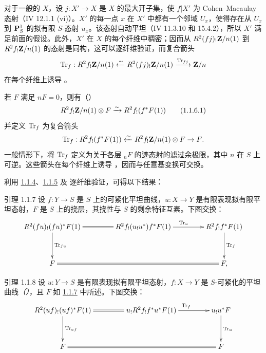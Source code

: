 对于一般的 $X$，设 $j:X'\rightarrow X$ 是 $X$ 的最大开子集，使 $f|X'$ 为 Cohen--Macaulay 态射（\cf \EGA IV 12.1.1 (vi)）。$X'$ 的每一点 $x$ 在 $X'$ 中都有一个邻域 $U_{x}$，使得存在从 $U_{x}$ 到 $\mathbf{P}^{1}_{S}$ 的拟有限 $S$-态射 $u_{x}$。该态射自动平坦（\EGA IV 11.3.10 和 15.4.2），所以 $X'$ 满足前面的假设。此外，$X'$ 在 $X$ 的每个纤维中稠密；因而从 $R^{2}(fj)_{!}\mathbf{Z}/n(1)$ 到 $R^{2}f_{!}\mathbf{Z}/n(1)$ 的态射是同构，这可以逐纤维验证，而复合箭头
$$
\operatorname{Tr}_{f}:R^{2}f_{!}\mathbf{Z}/n(1)\xleftarrow{\sim}
R^{2}(fj)_{!}\mathbf{Z}/n(1)\xrightarrow{\operatorname{Tr}_{fj}}\mathbf{Z}/n
$$
在每个纤维上诱导 。

若 $F$ 满足 $nF=0$，则有（）
\begin{equation*}
R^{2}f_{!}\mathbf{Z}/n(1)\otimes F\xrightarrow{\sim}
R^{2}f_{!}(f^{\ast}F(1))\tag{1.1.6.1}
\end{equation*}%
并定义 $\operatorname{Tr}_{f}$ 为复合箭头
$$
\operatorname{Tr}_{f}:R^{2}f_{!}(f^{\ast}F(1))\xleftarrow{\sim}
R^{2}f_{!}\mathbf{Z}/n(1) \otimes F\rightarrow F{}.
$$
一般情形下，将 $\operatorname{Tr}_{f}$ 定义为关于各层 ${}_nF$ 的迹态射的滤过余极限，其中 $n$ 在 $S$ 上可逆。这些箭头在每个纤维上诱导 ，因而与任意基变换可交换。\cqfd

利用 \hyperref[XVIII.lem1.1.4]{1.1.4}、\hyperref[XVIII.lem1.1.5]{1.1.5} 及  逐纤维\pageoriginale{}验证，可得以下结果：

\begin{enonce*}{引理 1.1.7}
设 $f:Y\rightarrow S$ 是 $S$ 上的可紧化平坦曲线，$u:X\rightarrow Y$ 是有限表现拟有限平坦态射，$F$ 是 $S$ 上的挠层，其挠性与 $S$ 的剩余特征互素。下图交换：
$$
\xymatrix@C=1.5cm@R=1.25cm{
R^2(fu)_! (fu)^{\ast}F(1) \ar[d]^{\Tr_{fu}}\ar@{=}[r]& R^2f_!(u_!
u^{\ast})f^{\ast}F(1) \ar[r]^{\Tr_u}& R^2f_!f^{\ast}F(1)\ar[d]^{\Tr_f} \\
F     \ar@{=}[rr] &&  F,
}
$$
\end{enonce*}

\begin{enonce*}{引理 1.1.8}
设 $u:Y\rightarrow S$ 是有限表现拟有限平坦态射，$f:X\rightarrow Y$ 是 $S$-可紧化的平坦曲线\emph{（）}，且 $F$ 如 \hyperref[XVIII.lem1.1.7]{1.1.7} 中所述。下图交换：
$$
\xymatrix@C=1.5cm@R=1.25cm{
R^{2}(uf)_! (uf)^{\ast}F(1)  \ar@{=}[r] \ar[d]^{\Tr_{uf}}&
u_!R^2f_!f^{\ast} u^{\ast}F(1) \ar[r]^{\Tr_f} &
u_!u^{\ast}F \ar[d]^{\Tr_u}\\
F        \ar@{=}[rr] & &  F
}
$$
\end{enonce*}

